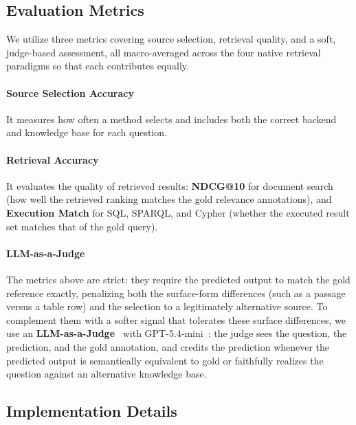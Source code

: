 \subsection{Evaluation Metrics}

We utilize three metrics covering source selection, retrieval quality, and a soft, judge-based assessment, all macro-averaged across the four native retrieval paradigms so that each contributes equally.

\vspace{-0.025in}
\paragraph{Source Selection Accuracy}
It measures how often a method selects and includes both the correct backend and knowledge base for each question.

\vspace{-0.025in}
\paragraph{Retrieval Accuracy}
It evaluates the quality of retrieved results: \textbf{NDCG@10} for document search (how well the retrieved ranking matches the gold relevance annotations), and \textbf{Execution Match} for SQL, SPARQL, and Cypher (whether the executed result set matches that of the gold query).

\vspace{-0.025in}
\paragraph{LLM-as-a-Judge}
The metrics above are strict: they require the predicted output to match the gold reference exactly, penalizing both the surface-form differences (such as a passage versus a table row) and the selection to a legitimately alternative source. To complement them with a softer signal that tolerates these surface differences, we use an \textbf{LLM-as-a-Judge}~\citep{GEval} with GPT-5.4-mini~\citep{GPT-54}: the judge sees the question, the prediction, and the gold annotation, and credits the prediction whenever the predicted output is semantically equivalent to gold or faithfully realizes the question against an alternative knowledge base.

\subsection{Implementation Details}

